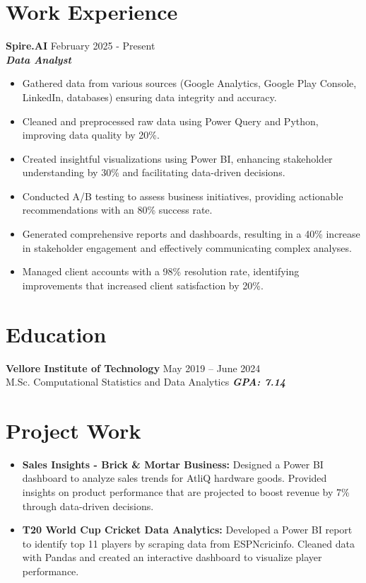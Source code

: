 \documentclass[a4paper,8pt]{article}
\begin{document}
\section{Work Experience}
\noindent
{\color[HTML]{1C033C}\textbf{{Spire.AI}}} \hfill {\color[HTML]{371e77}February 2025 - Present} \\
{\color[HTML]{371e77}\textbf{\textit{Data Analyst}}}
\vspace{-2pt}
\begin{itemize}[nosep,after=\strut, leftmargin=1.5em]
    \item Gathered data from various sources (Google Analytics, Google Play Console, LinkedIn, databases) ensuring data integrity and accuracy.
    \item Cleaned and preprocessed raw data using Power Query and Python, improving data quality by 20\%.
    \item Created insightful visualizations using Power BI, enhancing stakeholder understanding by 30\% and facilitating data-driven decisions.
    \item Conducted A/B testing to assess business initiatives, providing actionable recommendations with an 80\% success rate.
    \item Generated comprehensive reports and dashboards, resulting in a 40\% increase in stakeholder engagement and effectively communicating complex analyses.
    \item Managed client accounts with a 98\% resolution rate, identifying improvements that increased client satisfaction by 20\%.
\end{itemize}



\section{Education}
\noindent
{\color[HTML]{1C033C}\textbf{Vellore Institute of Technology}} \hfill {\color[HTML]{371e77}May 2019 – June 2024} \\
{\color[HTML]{371e77}M.Sc. Computational Statistics and Data Analytics} \hfill {\color[HTML]{4B28A4}\textit{\textbf{GPA: 7.14}}}

\section{Project Work}
\begin{itemize}[nosep,after=\strut, leftmargin=1.5em, itemsep=3pt]
    \item \textbf{Sales Insights - Brick \& Mortar Business:} Designed a Power BI dashboard to analyze sales trends for AtliQ hardware goods. Provided insights on product performance that are projected to boost revenue by 7\% through data-driven decisions.
    \item \textbf{T20 World Cup Cricket Data Analytics:} Developed a Power BI report to identify top 11 players by scraping data from ESPNcricinfo. Cleaned data with Pandas and created an interactive dashboard to visualize player performance.
\end{itemize}
\end{document}
